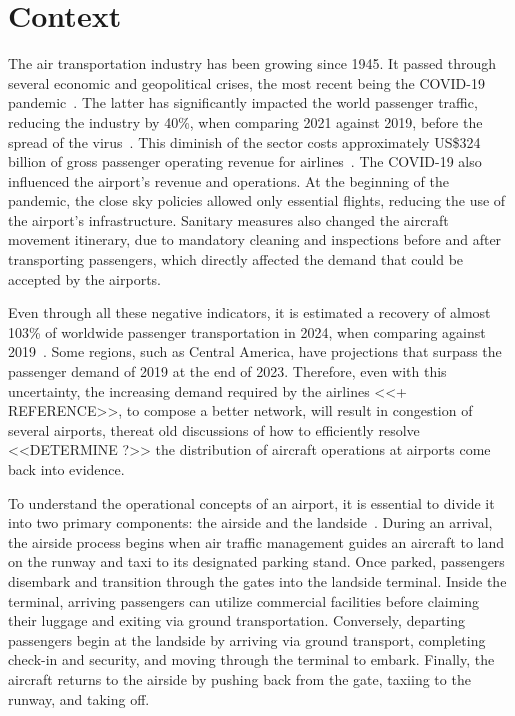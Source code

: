 \section{Context}
\label{sec:Context}

The air transportation industry has been growing since 1945.
%
It passed through several economic and geopolitical crises, the most recent
being the COVID-19 pandemic~\cite{ACI_AirTravelDemand2025}.
%
The latter has significantly impacted the world passenger traffic, reducing the
industry by 40\%, when comparing 2021 against 2019, before the spread of the
virus~\cite{kalic2022impact}.
%
This diminish of the sector costs approximately US\$324 billion of gross
passenger operating revenue for airlines~\cite{ICAOEconomicImpact}.
% 
The COVID-19 also influenced the airport's revenue and operations.
%
At the beginning of the pandemic, the close sky policies allowed only essential
flights, reducing the use of the airport's infrastructure.
%
Sanitary measures also changed the aircraft movement itinerary, due to mandatory
cleaning and inspections before and after transporting passengers, which
directly affected the demand that could be accepted by the airports.
%



Even through all these negative indicators, it is estimated a recovery of almost
103\% of worldwide passenger transportation in 2024, when comparing against
2019~\cite{IATA2024}.
%
Some regions, such as Central America, have projections that surpass the
passenger demand of 2019 at the end of 2023.
%
Therefore, even with this uncertainty, the increasing demand required by the
airlines <<+ REFERENCE>>, to compose a better network, will result in congestion
of several airports, thereat old discussions of how to efficiently resolve
<<DETERMINE ?>> the distribution of aircraft operations at airports come back
into evidence.



To understand the operational concepts of an airport, it is essential to divide
it into two primary components: the airside and the landside~\cite{Lance2009}.
%
During an arrival, the airside process begins when air traffic management guides
an aircraft to land on the runway and taxi to its designated parking stand.
%
Once parked, passengers disembark and transition through the gates into the
landside terminal.
%
Inside the terminal, arriving passengers can utilize commercial facilities
before claiming their luggage and exiting via ground transportation.
%
Conversely, departing passengers begin at the landside by arriving via ground
transport, completing check-in and security, and moving through the terminal to
embark.
%
Finally, the aircraft returns to the airside by pushing back from the gate,
taxiing to the runway, and taking off.



